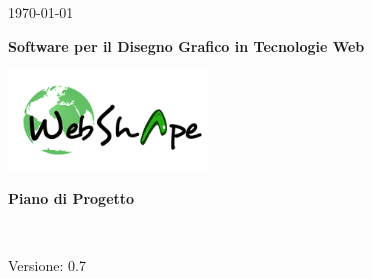 
\title{\TITOLODOC}
\author{Cunico Marco}



\renewcommand{\insertversion}{0.7} %
\renewcommand{\TITOLODOC}{Piano di Progetto} %
\renewcommand{\glosspath}{.\glossario} %

\begin{titlepage}
\begin{center}
	\begin{Large}	\today \end{Large}
\end{center}

\vspace{20pt}

\begin{center}
	\begin{Huge}
				\textbf{\ajax}
	\end{Huge}
\end{center}			

\begin{center}
	\begin{large}
				\textbf{Software per il Disegno Grafico in Tecnologie Web}
	\end{large}
\end{center}			

\vspace{20pt}

\begin{center}
\includegraphics[width=150pt]{../logo/logo}
\end{center}

\vspace{170pt}
\begin{center} %
	\begin{Huge}
				\textbf{\TITOLODOC}
	\end{Huge}
			\\
\end{center}
\vspace{210pt}
\begin{center}
Versione: \insertversion
\end{center}
\end{titlepage}

